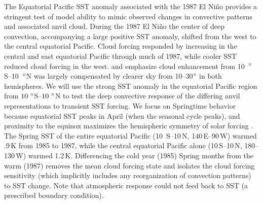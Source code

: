 \documentclass[twoside,agupp]{aguplus}
\begin{document}
The Equatorial Pacific SST anomaly associated with the 1987 El Ni\~no
provides a stringent test of model ability to mimic observed
changes in convective patterns and associated anvil cloud.
During the 1987 El Ni\~no the center of deep convection, accompanying
a large positive SST anomaly, shifted from the west to the central
equatorial Pacific. 
Cloud forcing responded by increasing in the central and east
equatorial Pacific through much of 1987, while cooler SST reduced
cloud forcing in the west.
\cite{HaM93} and \cite{Cho94} emphasize cloud enhancement from
10~$^{\circ}$S--10~$^{\circ}$N was largely compensated by clearer sky
from 10--30$^{\circ}$ in both hemispheres.
We will use the strong SST anomaly in the equatorial Pacific region
from $10\ ^{\circ}$S--$10\ ^{\circ}$N to test the deep convective
response of the differing anvil representations to transient SST
forcing.   
We focus on Springtime behavior because equatorial SST peaks in April
(when the seasonal cycle peaks), and proximity to the equinox
maximizes the hemispheric symmetry of solar forcing \cite[]{RaC91}. 
The Spring SST of the entire equatorial Pacific (10\,\dgr
S--10\,\dgr N, 140\,\dgr E--90\,\dgr W) warmed .9\,\dgr K
from 1985 to 1987, while the central equatorial Pacific alone
(10\,\dgr S--10\,\dgr N, 180--130\,\dgr W) warmed
1.2\,\dgr K. 
Differencing the cold year (1985) Spring months from the warm (1987)
removes the mean cloud forcing state and isolates the cloud forcing
sensitivity (which implicitly includes any reorganization of
convection patterns) to SST change.
Note that atmospheric response could not feed back to SST (a
prescribed boundary condition).  
\end{document}
